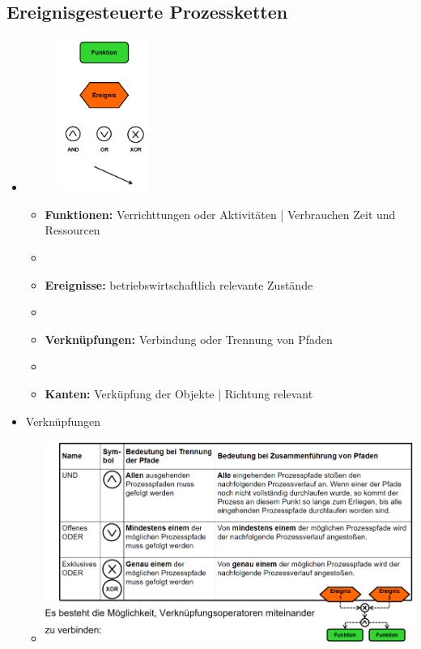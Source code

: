 \documentclass[11pt,a4paper]{article}
\begin{document}
\subsection{Ereignisgesteuerte Prozessketten}
\begin{itemize}
	\item[]
			\begin{minipage}{0.15\textwidth}
				\begin{figure}[H]
				\includegraphics[height=5cm]{Bilder/epkcomp}
				\end{figure}
			\end{minipage}
			\begin{minipage}[t]{0.75\textwidth}
				\vspace{-2.5cm}
				\begin{itemize}
				\item \textbf{Funktionen:} Verrichttungen oder Aktivitäten | Verbrauchen Zeit und Ressourcen
				\item[]
				\item \textbf{Ereignisse:} betriebswirtschaftlich relevante Zustände
				\item[]
				\item \textbf{Verknüpfungen:} Verbindung oder Trennung von Pfaden
				\item[]
				\item \textbf{Kanten:} Verküpfung der Objekte | Richtung relevant
				\end{itemize}
			\end{minipage}
	
	\item Verknüpfungen
		\begin{itemize}
			\item[] \includegraphics[width=16cm]{Bilder/connec}
		\end{itemize}
		

\end{itemize}
\end{document}
